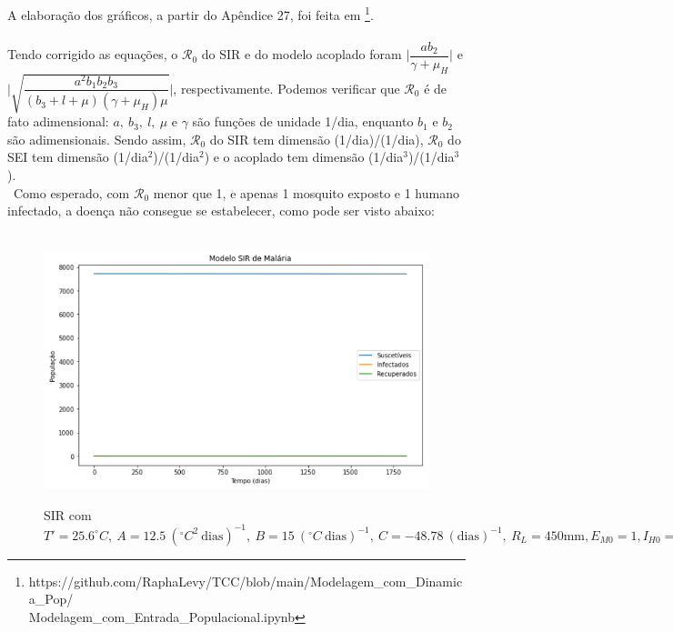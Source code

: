 A elaboração dos gráficos, a partir do Apêndice 27, foi feita em \footnote{https://github.com/RaphaLevy/TCC/blob/main/Modelagem\_com\_Dinamica\_Pop/ \\
Modelagem\_com\_Entrada\_Populacional.ipynb}.
\\\\
Tendo corrigido as equações, o $\mathcal{R}_0$ do SIR e do modelo acoplado 
foram $\Big | \dfrac{ab_2}{\gamma + \mu_H}\Big | $ e 
$\Big | \sqrt{\dfrac{a^2b_1b_2b_3}{(b_3+l+\mu)(\gamma+\mu_H)\mu}}\Big | $, respectivamente. Podemos verificar que $\mathcal{R}_0$ é de fato adimensional: $a, \ b_3, \ l, \ \mu$ e $\gamma$ são funções de unidade 1/dia, enquanto $b_1$ e $b_2$ são adimensionais. Sendo assim, $\mathcal{R}_0$ do SIR tem dimensão (1/dia)/(1/dia), $\mathcal{R}_0$ do SEI tem dimensão (1/dia$^2$)/(1/dia$^2$) e o acoplado tem dimensão (1/dia$^3$)/(1/dia$^3$). 
\\\
Como esperado, com $\mathcal{R}_0$ menor que 1, e apenas 1 mosquito exposto e 
1 humano infectado, a doença não consegue se estabelecer, como pode ser visto abaixo:
\begin{figure}[!ht]
        \centering
        \hbox{\hspace{2.5em} \includegraphics[scale=0.7] {SIR_Entrada_Pop_1_1_Infect.png}}
        \caption{SIR com $T'=25.6 ^\circ C, \ A=12.5 \ (^\circ C^2 \ \text{dias})^{-1}, \ B=15 \ (^\circ C \ \text{dias})^{-1}, \ C=-48.78 \ (\text{dias})^{-1}, \ R_L=450 \text{mm}, E_{M0}=1, I_{H0}=1$} 
\end{figure} 
